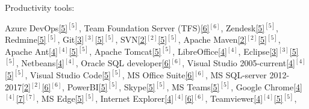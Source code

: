 \begin{cventries}
  \cventry
    {Productivity tools:} %
    {} %
    {} %
    {} %
    {
      \vspace{0.1cm}
      \begin{cvitems} %
        \item[] {        
        \textcolor{rainbowcolor-olive}{Azure DevOps\ref{5}{$^{[5]}$}},         
        \textcolor{rainbowcolor-olive}{Team Foundation Server (TFS)\ref{6}{$^{[6]}$}},
        \textcolor{rainbowcolor-olive}{Zendesk\ref{5}{$^{[5]}$}},
        \textcolor{rainbowcolor-olive}{Redmine\ref{5}{$^{[5]}$}},
        \textcolor{rainbowcolor-olive}{Git\ref{3}{$^{[3]}$}\ref{5}{$^{[5]}$}}, 
        \textcolor{rainbowcolor-olive}{SVN\ref{2}{$^{[2]}$}\ref{5}{$^{[5]}$}},
        \textcolor{rainbowcolor-olive}{Apache Maven\ref{2}{$^{[2]}$}\ref{5}{$^{[5]}$}},
        \textcolor{rainbowcolor-olive}{Apache Ant\ref{4}{$^{[4]}$}\ref{5}{$^{[5]}$}},  
        \textcolor{rainbowcolor-olive}{Apache Tomcat\ref{5}{$^{[5]}$}}, 
        \textcolor{rainbowcolor-olive}{LibreOffice\ref{4}{$^{[4]}$}}, 
        \textcolor{rainbowcolor-olive}{Eclipse\ref{3}{$^{[3]}$}\ref{5}{$^{[5]}$}},  
        \textcolor{rainbowcolor-olive}{Netbeans\ref{4}{$^{[4]}$}}, 
        \textcolor{rainbowcolor-olive}{Oracle SQL developer\ref{6}{$^{[6]}$}},
        \textcolor{rainbowcolor-olive}{Visual Studio 2005-current\ref{4}{$^{[4]}$}\ref{5}{$^{[5]}$}},
        \textcolor{rainbowcolor-olive}{Visual Studio Code\ref{5}{$^{[5]}$}},
        \textcolor{rainbowcolor-olive}{MS Office Suite\ref{6}{$^{[6]}$}},
        \textcolor{rainbowcolor-olive}{MS SQL-server 2012-2017\ref{2}{$^{[2]}$}\ref{6}{$^{[6]}$}},
		\textcolor{rainbowcolor-olive}{PowerBI\ref{5}{$^{[5]}$}}, 
        \textcolor{rainbowcolor-olive}{Skype\ref{5}{$^{[5]}$}},
        \textcolor{rainbowcolor-olive}{MS Teams\ref{5}{$^{[5]}$}},
        \textcolor{rainbowcolor-olive}{Google Chrome\ref{4}{$^{[4]}$}\ref{7}{$^{[7]}$}},
        \textcolor{rainbowcolor-olive}{MS Edge\ref{5}{$^{[5]}$}},
        \textcolor{rainbowcolor-olive}{Internet Explorer\ref{4}{$^{[4]}$}\ref{6}{$^{[6]}$}},
        \textcolor{rainbowcolor-olive}{Teamviewer\ref{4}{$^{[4]}$}\ref{5}{$^{[5]}$}},
}
\end{cvitems}}
\end{cventries}
